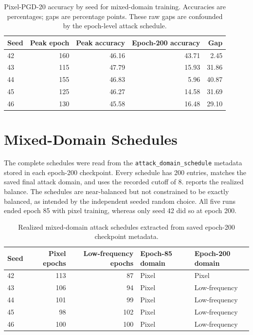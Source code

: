 \documentclass{article}
\begin{document}
\begin{table}[t]
\centering
\caption{Pixel-PGD-20 accuracy by seed for mixed-domain training.
Accuracies are percentages; gaps are percentage points. These raw gaps
are confounded by the epoch-level attack schedule.}
\label{tab:per-seed-mixed}
\begin{tabular*}{\linewidth}{@{\extracolsep{\fill}}lrrrr@{}}
\toprule
Seed & Peak epoch & Peak accuracy & Epoch-200 accuracy & Gap \\
\midrule
42 & 160 & 46.16 & 43.71 & 2.45 \\
43 & 115 & 47.79 & 15.93 & 31.86 \\
44 & 155 & 46.83 & 5.96 & 40.87 \\
45 & 125 & 46.27 & 14.58 & 31.69 \\
46 & 130 & 45.58 & 16.48 & 29.10 \\
\bottomrule
\end{tabular*}
\end{table}

\FloatBarrier
\section{Mixed-Domain Schedules}
\label{app:schedules}
The complete schedules were read from the \texttt{attack\_domain\_schedule}
metadata stored in each epoch-200 checkpoint. Every schedule has 200 entries,
matches the saved final attack domain, and uses the recorded cutoff of $8$.
 reports the realized balance. The schedules are
near-balanced but not constrained to be exactly balanced, as intended by the
independent seeded random choice. All five runs ended epoch 85 with pixel
training, whereas only seed 42 did so at epoch 200.

\begin{table}[t]
\centering
\caption{Realized mixed-domain attack schedules extracted from saved
epoch-200 checkpoint metadata.}
\label{tab:mixed-schedules}
\begin{tabular*}{\linewidth}{@{\extracolsep{\fill}}lrrll@{}}
\toprule
Seed & Pixel epochs & Low-frequency epochs & Epoch-85 domain & Epoch-200 domain \\
\midrule
42 & 113 & 87 & Pixel & Pixel \\
43 & 106 & 94 & Pixel & Low-frequency \\
44 & 101 & 99 & Pixel & Low-frequency \\
45 & 98 & 102 & Pixel & Low-frequency \\
46 & 100 & 100 & Pixel & Low-frequency \\
\bottomrule
\end{tabular*}
\end{table}
\end{document}
